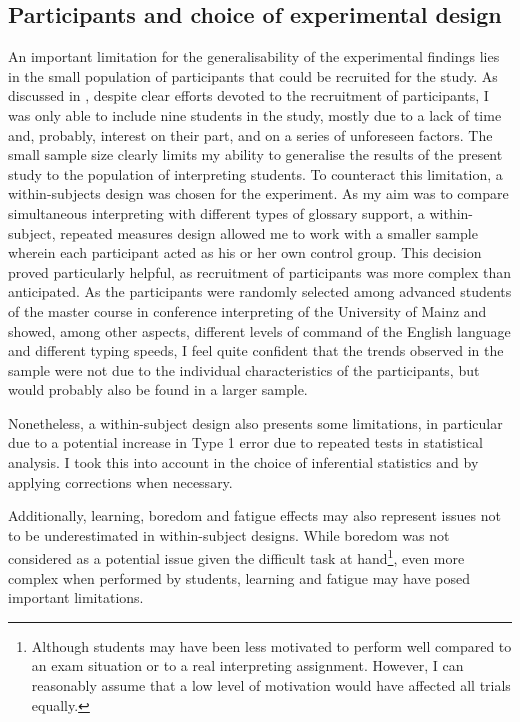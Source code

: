 \subsection{Participants and choice of experimental design} \label{limit_design}
An important limitation for the generalisability of the experimental findings lies in the small population of participants that could be recruited for the study. As discussed in , despite clear efforts devoted to the recruitment of participants, I was only able to include nine students in the study, mostly due to a lack of time and, probably, interest on their part, and on a series of unforeseen factors. The small sample size clearly limits my ability to generalise the results of the present study to the population of interpreting students. To counteract this limitation, a within-subjects design was chosen for the experiment. As my aim was to compare simultaneous interpreting with different types of glossary support, a within-subject, repeated measures design allowed me to work with a smaller sample wherein each participant acted as his or her own control group. This decision proved particularly helpful, as recruitment of participants was more complex than anticipated. As the participants were randomly selected among advanced students of the master course in conference interpreting of the University of Mainz and showed, among other aspects, different levels of command of the English language and different typing speeds, I feel quite confident that the trends observed in the sample were not due to the individual characteristics of the participants, but would probably also be found in a larger sample.

Nonetheless, a within-subject design also presents some limitations, in particular due to a potential increase in Type 1 error due to repeated tests in statistical analysis. I took this into account in the choice of inferential statistics and by applying corrections when necessary.

Additionally, learning, boredom and fatigue effects may also represent issues not to be underestimated in within-subject designs. While boredom was not considered as a potential issue given the difficult task at hand\footnote{Although students may have been less motivated to perform well compared to an exam situation or to a real interpreting assignment. However, I can reasonably assume that a low level of motivation would have affected all trials equally.}, even more complex when performed by students, learning and fatigue may have posed important limitations.


